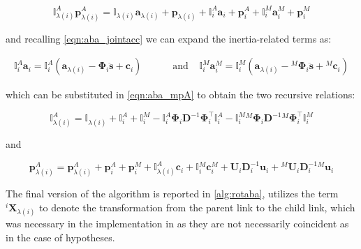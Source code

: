 \begin{equation}
    \label{eqn:aba_mpA}
    \mathbb{I} _{\lambda(i)} ^A \mathbf{p} _{\lambda(i)} ^A = \mathbb{I} _{\lambda (i)} \mathbf{a} _{\lambda (i)} + \mathbf{p} _{\lambda (i)} + \mathbb{I} _i ^A \mathbf{a} _i + \mathbf{p} _i ^A + \mathbb{I} _i ^M \mathbf{a} _i ^M + \mathbf{p} _i ^M
\end{equation}

and recalling \cref{eqn:aba_jointacc} we can expand the inertia-related terms as:

\begin{align}
    \mathbb{I} _i ^A \mathbf{a} _i = \mathbb{I} _i ^A (\mathbf{a} _{\lambda (i)} - \boldsymbol{\Phi} _i \ddot{\mathbf{s}} + \mathbf{c}_i) & \qquad \text{ and } & \mathbb{I} _i ^M \mathbf{a} _i ^M = \mathbb{I} _i ^M (\mathbf{a} _{\lambda (i)} - {} ^M \boldsymbol{\Phi} _i \ddot{\mathbf{s}} + {} ^M \mathbf{c}_i)
\end{align}

which can be substituted in \cref{eqn:aba_mpA} to obtain the two recursive relations:

\begin{equation}
    \mathbb{I} _{\lambda(i)} ^A = \mathbb{I} _{\lambda (i)} + \mathbb{I} _i ^A + \mathbb{I} _i ^M - \mathbb{I} _i ^A \boldsymbol{\Phi} _i \mathbf{D}^{-1} \boldsymbol{\Phi} _i ^\top  \mathbb{I} _i ^A - \mathbb{I} _i ^M {} ^M \boldsymbol{\Phi} _i \mathbf{D}^{-1} {} ^M \boldsymbol{\Phi} _i ^\top  \mathbb{I} _i ^M
\end{equation}

and

\begin{equation}
    \mathbf{p} ^A _{\lambda (i)} = \mathbf{p} ^A _{\lambda (i)} + \mathbf{p} ^A_i + \mathbf{p} ^M_i  + \mathbb{I} ^A _{\lambda (i)}  \mathbf{c}_i + \mathbb{I} {} ^M _i \mathbf{c} ^M _i + {}  \mathbf{U} _i \mathbf{D} ^{-1} _i {} \mathbf{u} _i + {} ^M \mathbf{U} _i \mathbf{D} ^{-1} _i {} ^M\mathbf{u} _i
\end{equation}

The final version of the algorithm is reported in \cref{alg:rotaba}, utilizes the term  ${}^i\mathbf{X} _{\lambda (i)}$ to denote the transformation from the parent link to the child link, which was necessary in the implementation in \jaxsim as they are not necessarily coincident as in the case of \citet{featherstone_rigid_2008} hypotheses.

